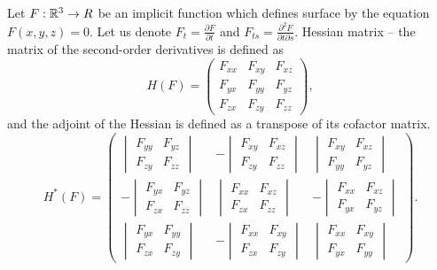 Let $F:\R^3 \to R$ be an implicit function which defines surface by the equation $F(x, y, z) = 0$. 
Let us denote $F_t = \frac{\partial F}{\partial t}$ and $F_{ts} = \frac{\partial^2 F}{\partial t \partial s}$.
Hessian matrix -- the matrix of the second-order derivatives is defined as 
$$
H(F) = 
\begin{pmatrix}
    F_{xx} & F_{xy} & F_{xz} \\
    F_{yx} & F_{yy} & F_{yz} \\
    F_{zx} & F_{zy} & F_{zz}
\end{pmatrix},
$$
and the adjoint of the Hessian is defined as a transpose of its cofactor matrix.
$$
H^*(F) = 
\begin{pmatrix}
    \begin{vmatrix} F_{yy} & F_{yz} \\ F_{zy} & F_{zz} \end{vmatrix} & 
    -\begin{vmatrix} F_{xy} & F_{xz} \\ F_{zy} & F_{zz} \end{vmatrix} &
    \begin{vmatrix} F_{xy} & F_{xz} \\ F_{yy} & F_{yz} \end{vmatrix} \\

    -\begin{vmatrix} F_{yx} & F_{yz} \\ F_{zx} & F_{zz} \end{vmatrix} &
    \begin{vmatrix} F_{xx} & F_{xz} \\ F_{zx} & F_{zz} \end{vmatrix} & 
    -\begin{vmatrix} F_{xx} & F_{xz} \\ F_{yx} & F_{yz} \end{vmatrix} \\

    \begin{vmatrix} F_{yx} & F_{yy} \\ F_{zx} & F_{zy} \end{vmatrix} & 
    -\begin{vmatrix} F_{xx} & F_{xy} \\ F_{zx} & F_{zy} \end{vmatrix} & 
    \begin{vmatrix} F_{xx} & F_{xy} \\ F_{yx} & F_{yy} \end{vmatrix}
\end{pmatrix}.
$$

